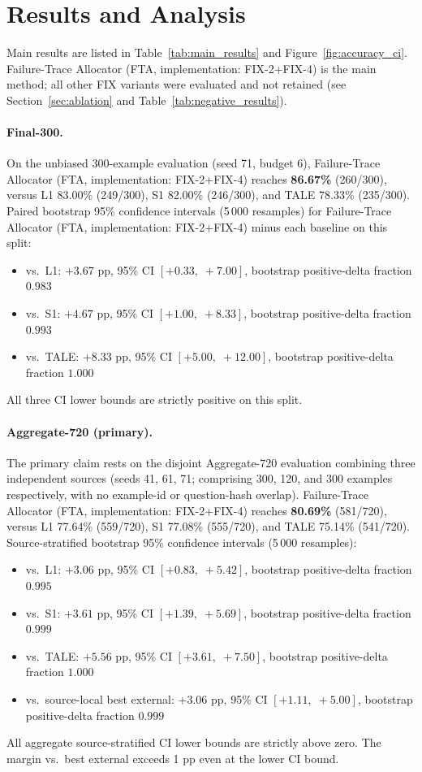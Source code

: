 \section{Results and Analysis}
\label{sec:results}

Main results are listed in Table~\ref{tab:main_results} and Figure~\ref{fig:accuracy_ci}.
Failure-Trace Allocator (FTA, implementation: FIX-2+FIX-4) is the main method; all other FIX variants were evaluated and not retained
(see Section~\ref{sec:ablation} and Table~\ref{tab:negative_results}).

\paragraph{Final-300.}
On the unbiased 300-example evaluation (seed 71, budget 6), Failure-Trace Allocator (FTA, implementation: FIX-2+FIX-4) reaches
\textbf{86.67\%} (260/300), versus L1 83.00\% (249/300), S1 82.00\% (246/300),
and TALE 78.33\% (235/300).
Paired bootstrap 95\% confidence intervals (5\,000 resamples) for Failure-Trace Allocator (FTA, implementation: FIX-2+FIX-4)
minus each baseline on this split:
\begin{itemize}[nosep,leftmargin=1.5em]
  \item vs.\ L1: $+3.67$ pp, 95\% CI $[+0.33,\;+7.00]$, bootstrap positive-delta fraction $0.983$
  \item vs.\ S1: $+4.67$ pp, 95\% CI $[+1.00,\;+8.33]$, bootstrap positive-delta fraction $0.993$
  \item vs.\ TALE: $+8.33$ pp, 95\% CI $[+5.00,\;+12.00]$, bootstrap positive-delta fraction $1.000$
\end{itemize}
All three CI lower bounds are strictly positive on this split.

\paragraph{Aggregate-720 (primary).}
The primary claim rests on the disjoint Aggregate-720 evaluation combining three independent
sources (seeds 41, 61, 71; comprising 300, 120, and 300 examples respectively,
with no example-id or question-hash overlap).
Failure-Trace Allocator (FTA, implementation: FIX-2+FIX-4) reaches \textbf{80.69\%} (581/720), versus L1 77.64\% (559/720),
S1 77.08\% (555/720), and TALE 75.14\% (541/720).
Source-stratified bootstrap 95\% confidence intervals (5\,000 resamples):
\begin{itemize}[nosep,leftmargin=1.5em]
  \item vs.\ L1: $+3.06$ pp, 95\% CI $[+0.83,\;+5.42]$, bootstrap positive-delta fraction $0.995$
  \item vs.\ S1: $+3.61$ pp, 95\% CI $[+1.39,\;+5.69]$, bootstrap positive-delta fraction $0.999$
  \item vs.\ TALE: $+5.56$ pp, 95\% CI $[+3.61,\;+7.50]$, bootstrap positive-delta fraction $1.000$
  \item vs.\ source-local best external: $+3.06$ pp, 95\% CI $[+1.11,\;+5.00]$,
        bootstrap positive-delta fraction $0.999$
\end{itemize}
All aggregate source-stratified CI lower bounds are strictly above zero.
The margin vs.\ best external exceeds 1 pp even at the lower CI bound.


